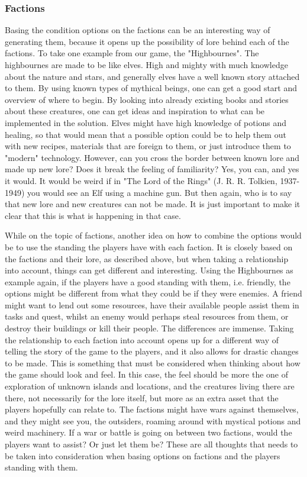 \subsubsection{Factions}
Basing the condition options on the factions can be an interesting way of generating them, because it opens up the possibility of lore behind each of the factions. To take one example from our game, the "Highbournes". The highbournes are made to be like elves. High and mighty with much knowledge about the nature and stars, and generally elves have a well known story attached to them. By using known types of mythical beings, one can get a good start and overview of where to begin. By looking into already existing books and stories about these creatures, one can get ideas and inspiration to what can be implemented in the solution. Elves might have high knowledge of potions and healing, so that would mean that a possible option could be to help them out with new recipes, materials that are foreign to them, or just introduce them to "modern" technology.
However, can you cross the border between known lore and made up new lore? Does it break the feeling of familiarity?
Yes, you can, and yes it would. It would be weird if in "The Lord of the Rings" (J. R. R. Tolkien, 1937-1949) you would see an Elf using a machine gun.
But then again, who is to say that new lore and new creatures can not be made. It is just important to make it clear that this is what is happening in that case.

While on the topic of factions, another idea on how to combine the options would be to use the standing the players have with each faction. It is closely based on the factions and their lore, as described above, but when taking a relationship into account, things can get different and interesting. Using the Highbournes as example again, if the players have a good standing with them, i.e. friendly, the options might be different from what they could be if they were enemies. A friend might want to lend out some resources, have their available people assist them in tasks and quest, whilst an enemy would perhaps steal resources from them, or destroy their buildings or kill their people. The differences are immense. Taking the relationship to each faction into account opens up for a different way of telling the story of the game to the players, and it also allows for drastic changes to be made. This is something that must be considered when thinking about how the game should look and feel. In this case, the feel should be more the one of exploration of unknown islands and locations, and the creatures living there are there, not necessarily for the lore itself, but more as an extra asset that the players hopefully can relate to. The factions might have wars against themselves, and they might see you, the outsiders, roaming around with mystical potions and weird machinery. If a war or battle is going on between two factions, would the players want to assist? Or just let them be? These are all thoughts that needs to be taken into consideration when basing options on factions and the players standing with them.


